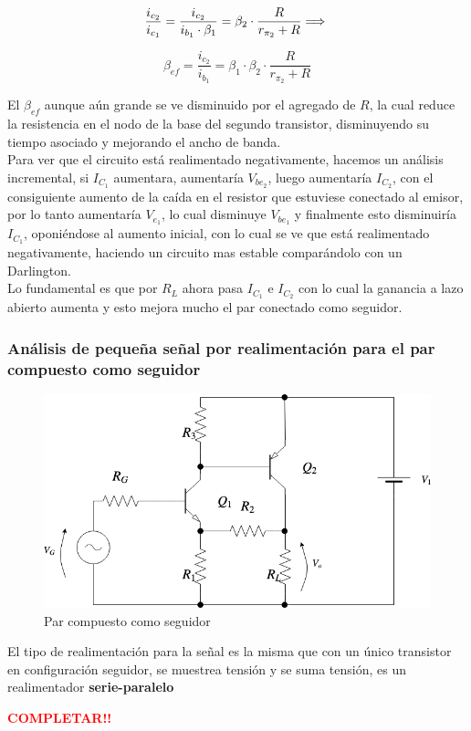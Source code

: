 \begin{equation}
\frac{i_{c_{2}}}{i_{c_{1}}} =\frac{i_{c_{2}}}{i_{b_{1}} \cdot  \beta_{1} }= \beta_{2} \cdot \frac{R}{r_{\pi_{2} }+ R}  \Longrightarrow \\
\end{equation}


\begin{equation}
\boxed{\beta_{ef} = \frac{i_{c_{2}}}{i_{b_{1}}} = \beta_{1} \cdot \beta_{2} \cdot \frac{R}{r_{\pi_{2} }+ R}}
\end{equation}


El $\beta_{ef}$ aunque aún grande se ve disminuido por el agregado de $R$, la cual reduce la resistencia en el nodo de la base del segundo transistor, disminuyendo su tiempo asociado y mejorando el ancho de banda.\\

Para ver que el circuito está realimentado negativamente, hacemos un análisis incremental, si $I_{C_{1}}$ aumentara, aumentaría $V_{be_{2}}$, luego aumentaría $I_{C_{2}}$, con el consiguiente aumento de la caída en el resistor que estuviese conectado al emisor, por lo tanto aumentaría $V_{e_{1}}$, lo cual disminuye $V_{be_{1}}$ y finalmente esto disminuiría $I_{C_{1}}$, oponiéndose al aumento inicial, con lo cual se ve que está realimentado negativamente, haciendo un circuito mas estable comparándolo con un Darlington. \\
Lo fundamental es que por $R_{L}$ ahora pasa $I_{C_{1}}$ e $I_{C_{2}}$ con lo cual la ganancia a lazo abierto aumenta y esto mejora mucho el par conectado como seguidor.


\subsubsection{Análisis de pequeña señal por realimentación para el par compuesto como seguidor}


\begin{figure}[H] %
\begin{center}
\includegraphics[width=0.9 \textwidth, angle=0]{./img/sziklai/sziklai1.png}
\caption{\label{fig:fig_sziklai_cir_1}\footnotesize{Par compuesto como seguidor}}
\end{center}
\end{figure}

El tipo de realimentación para la señal es la misma que con un único transistor en configuración seguidor, se muestrea tensión y se suma tensión, es un realimentador \textbf{serie-paralelo}

\textcolor{red}{\textbf{COMPLETAR!!}}


\clearpage